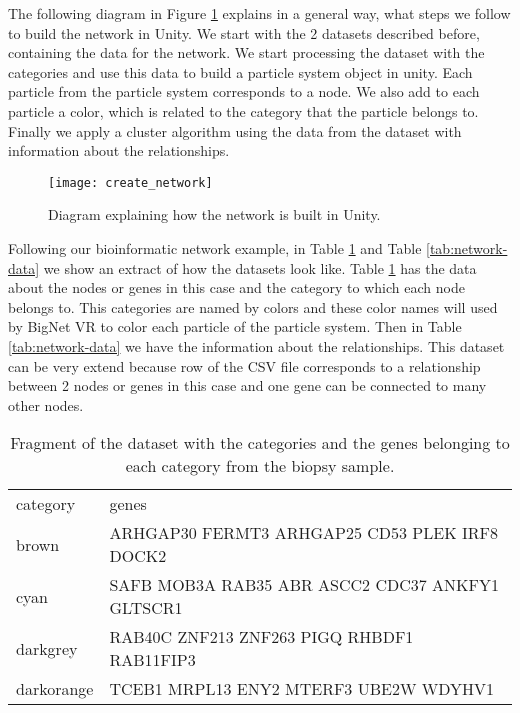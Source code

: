 The following diagram in Figure \ref{fig:create_network} explains in a general way, what steps we follow to build the network in Unity. We start with the 2 datasets described before, containing the data for the network. We start processing the dataset with the categories and use this data to build a particle system object in unity. Each particle from the particle system corresponds to a node. We also add to each particle a color, which is related to the category that the particle belongs to. Finally we apply a cluster algorithm using the data from the dataset with information about the relationships.

\begin{figure}[h!]
    \centering%
    \texttt{[image: create\_network]}
    \caption{Diagram explaining how the network is built in Unity.}
    \label{fig:create_network}
\end{figure}%

Following our bioinformatic network example, in Table \ref{tab:categories-data} and Table \ref{tab:network-data} we show an extract of how the datasets look like. Table \ref{tab:categories-data} has the data about the nodes or genes in this case and the category to which each node belongs to. This categories are named by colors and these color names will used by BigNet VR to color each particle of the particle system. Then in Table \ref{tab:network-data} we have the information about the relationships. This dataset can be very extend because row of the CSV file corresponds to a relationship between 2 nodes or genes in this case and one gene can be connected to many other nodes.

\begin{table}[h!]
\centering
\begin{tabular}{ll}
\hline
category & genes          \\
brown   & ARHGAP30 FERMT3 ARHGAP25 CD53 PLEK IRF8 DOCK2\\
cyan  & SAFB MOB3A RAB35 ABR ASCC2 CDC37 ANKFY1 GLTSCR1\\
darkgrey  & RAB40C ZNF213 ZNF263 PIGQ RHBDF1 RAB11FIP3\\
darkorange  & TCEB1 MRPL13 ENY2 MTERF3 UBE2W WDYHV1\\
\hline
\end{tabular}
\caption{Fragment of the dataset with the categories and the genes belonging to each category from the biopsy sample.}
\label{tab:categories-data}
\end{table}

